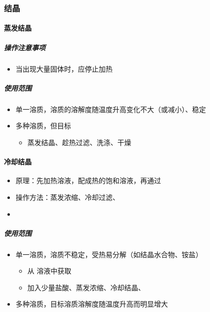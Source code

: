 \documentclass[10pt]{article}
\begin{document}
	\subsubsection{结晶}
	
	\paragraph{蒸发结晶}
	
	\subparagraph{操作注意事项}
	
	\begin{itemize}
		\item 当出现大量固体时，应停止加热
	\end{itemize}
	
	\subparagraph{使用范围}
	
	\begin{itemize}
		\item 单一溶质，溶质的溶解度随温度升高变化不大（或减小）、稳定
		\item 多种溶质，但目标
		\begin{itemize}
			\item 蒸发结晶、趁热过滤、洗涤、干燥
		\end{itemize}
	\end{itemize}
	
	\paragraph{冷却结晶}
	
	\begin{itemize}
		\item 原理：先加热溶液，配成热的饱和溶液，再通过
		\item 操作方法：蒸发浓缩、冷却过滤、
		\item 
	\end{itemize}
	
	\subparagraph{使用范围}
	
	\begin{itemize}
		\item 单一溶质，溶质不稳定，受热易分解（如结晶水合物、铵盐）
		\begin{itemize}
			\item 从 溶液中获取 
			\item 加入少量盐酸、蒸发浓缩、冷却结晶、
		\end{itemize}
		\item 多种溶质，目标溶质溶解度随温度升高而明显增大
	\end{itemize}
	
\end{document}
